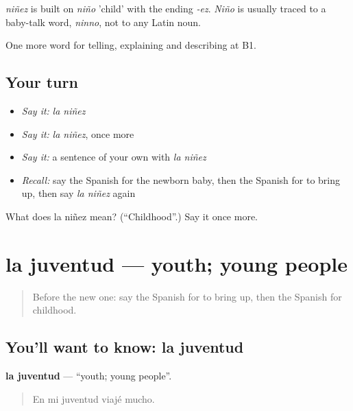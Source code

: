 \begin{cousinweb}
\emph{niñez} is built on \emph{niño} 'child' with the ending \emph{-ez}. \emph{Niño} is usually traced to a baby-talk word, \emph{ninno}, not to any Latin noun.
\end{cousinweb}

\begin{grammarlens}[title={What you've built}]
One more word for telling, explaining and describing at B1.
\end{grammarlens}

\subsection*{Your turn}
\begin{itemize}
\raggedright
  \item \emph{Say it:} \emph{la niñez}
  \item \emph{Say it:} \emph{la niñez}, once more
  \item \emph{Say it:} a sentence of your own with \emph{la niñez}
  \item \emph{Recall:} say the Spanish for the newborn baby, then the Spanish for to bring up, then say \emph{la niñez} again
\end{itemize}

\begin{tcolorbox}[breakable,colback=teal!4,colframe=teal!35!black,title={Before you move on}]
What does la niñez mean? (\textquotedblleft{}Childhood\textquotedblright{}.) Say it once more.
\end{tcolorbox}
\section[la juventud]{la juventud — youth; young people}

\label{lesson:ES-C545-juventud}



\begin{quote}
Before the new one: say the Spanish for to bring up, then the Spanish for childhood.
\end{quote}

\subsection*{You'll want to know: la juventud}
\textbf{la juventud} — \textquotedblleft{}youth; young people\textquotedblright{}.

\begin{quote}
En mi juventud viajé mucho.
\end{quote}

